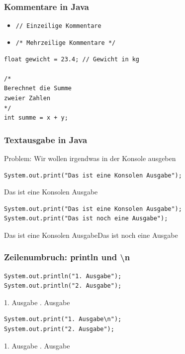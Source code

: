 \documentclass{../../presentation}
\begin{document}
\begin{frame}[fragile]
  \frametitle{Kommentare in Java}
  \pause
  \begin{itemize}
    \item \texttt{// Einzeilige Kommentare}
    \item \texttt{/* Mehrzeilige Kommentare */}
  \end{itemize}
  \pause
  \vspace{1em}
  \begin{verbatim}
float gewicht = 23.4; // Gewicht in kg

/*
Berechnet die Summe
zweier Zahlen
*/
int summe = x + y;
  \end{verbatim}
\end{frame}

\begin{frame}[fragile]
  \frametitle{Textausgabe in Java}
  \pause
  Problem: Wir wollen irgendwas in der Konsole ausgeben
  \pause
  \vspace{0.5em}
  \begin{verbatim}
System.out.print("Das ist eine Konsolen Ausgabe");
  \end{verbatim}
  \begin{ausgabe}
    Das ist eine Konsolen Ausgabe
  \end{ausgabe}
  \pause
  \begin{verbatim}
System.out.print("Das ist eine Konsolen Ausgabe");
System.out.print("Das ist noch eine Ausgabe");
  \end{verbatim}
  \pause
  \begin{ausgabe}
    Das ist eine Konsolen AusgabeDas ist noch eine Ausgabe
  \end{ausgabe}
\end{frame}

\begin{frame}[fragile]
  \frametitle{Zeilenumbruch: println und \textbackslash n}
  \pause
  \begin{verbatim}
System.out.println("1. Ausgabe");
System.out.println("2. Ausgabe");
  \end{verbatim}
  \pause
  \begin{ausgabe}
    1. Ausgabe . Ausgabe
  \end{ausgabe}
  \pause
  \begin{verbatim}
System.out.print("1. Ausgabe\n");
System.out.print("2. Ausgabe");
  \end{verbatim}
  \pause
  \begin{ausgabe}
    1. Ausgabe . Ausgabe
  \end{ausgabe}
\end{frame}
\end{document}
